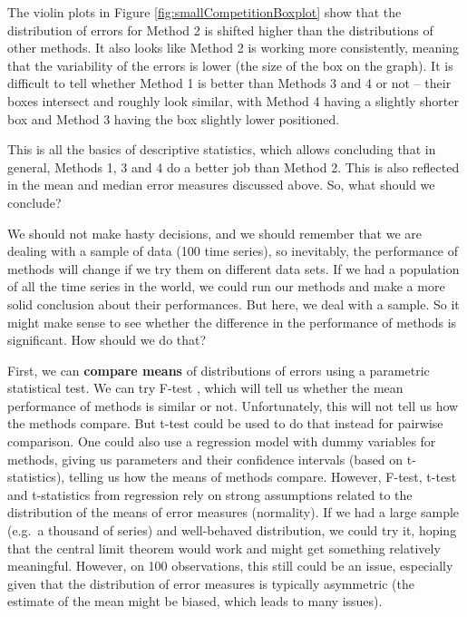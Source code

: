 \documentclass[]{book}
\theoremstyle{definition}
\theoremstyle{definition}
\theoremstyle{definition}
\theoremstyle{definition}
\theoremstyle{remark}
\begin{document}
The violin plots in Figure \ref{fig:smallCompetitionBoxplot} show that the distribution of errors for Method 2 is shifted higher than the distributions of other methods. It also looks like Method 2 is working more consistently, meaning that the variability of the errors is lower (the size of the box on the graph). It is difficult to tell whether Method 1 is better than Methods 3 and 4 or not -- their boxes intersect and roughly look similar, with Method 4 having a slightly shorter box and Method 3 having the box slightly lower positioned.

This is all the basics of descriptive statistics, which allows concluding that in general, Methods 1, 3 and 4 do a better job than Method 2. This is also reflected in the mean and median error measures discussed above. So, what should we conclude?

We should not make hasty decisions, and we should remember that we are dealing with a sample of data (100 time series), so inevitably, the performance of methods will change if we try them on different data sets. If we had a population of all the time series in the world, we could run our methods and make a more solid conclusion about their performances. But here, we deal with a sample. So it might make sense to see whether the difference in the performance of methods is significant. How should we do that?

First, we can \textbf{compare means} of distributions of errors using a parametric statistical test. We can try F-test \citep{WikipediaFTest}, which will tell us whether the mean performance of methods is similar or not. Unfortunately, this will not tell us how the methods compare. But t-test \citep{WikipediaTTest} could be used to do that instead for pairwise comparison. One could also use a regression model with dummy variables for methods, giving us parameters and their confidence intervals (based on t-statistics), telling us how the means of methods compare. However, F-test, t-test and t-statistics from regression rely on strong assumptions related to the distribution of the means of error measures (normality). If we had a large sample (e.g.~a thousand of series) and well-behaved distribution, we could try it, hoping that the central limit theorem would work and might get something relatively meaningful. However, on 100 observations, this still could be an issue, especially given that the distribution of error measures is typically asymmetric (the estimate of the mean might be biased, which leads to many issues).
\end{document}
